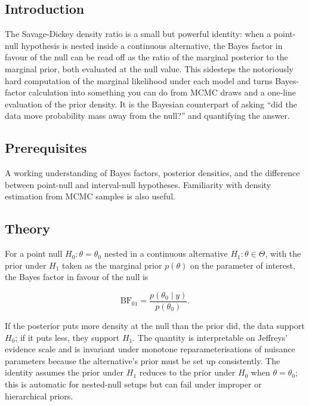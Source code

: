\documentclass[
]{article}
\author{}
\date{\vspace{-2.5em}}
\begin{document}
\subsection{Introduction}\label{introduction}

The Savage-Dickey density ratio is a small but powerful identity: when a
point-null hypothesis is nested inside a continuous alternative, the
Bayes factor in favour of the null can be read off as the ratio of the
marginal posterior to the marginal prior, both evaluated at the null
value. This sidesteps the notoriously hard computation of the marginal
likelihood under each model and turns Bayes-factor calculation into
something you can do from MCMC draws and a one-line evaluation of the
prior density. It is the Bayesian counterpart of asking ``did the data
move probability mass away from the null?'' and quantifying the answer.

\subsection{Prerequisites}\label{prerequisites}

A working understanding of Bayes factors, posterior densities, and the
difference between point-null and interval-null hypotheses. Familiarity
with density estimation from MCMC samples is also useful.

\subsection{Theory}\label{theory}

For a point null \(H_0 : \theta = \theta_0\) nested in a continuous
alternative \(H_1 : \theta \in \Theta\), with the prior under \(H_1\)
taken as the marginal prior \(p(\theta)\) on the parameter of interest,
the Bayes factor in favour of the null is

\[\mathrm{BF}_{01} = \frac{p(\theta_0 \mid y)}{p(\theta_0)}.\]

If the posterior puts more density at the null than the prior did, the
data support \(H_0\); if it puts less, they support \(H_1\). The
quantity is interpretable on Jeffreys' evidence scale and is invariant
under monotone reparameterisations of nuisance parameters because the
alternative's prior must be set up consistently. The identity assumes
the prior under \(H_1\) reduces to the prior under \(H_0\) when
\(\theta = \theta_0\); this is automatic for nested-null setups but can
fail under improper or hierarchical priors.
\end{document}
